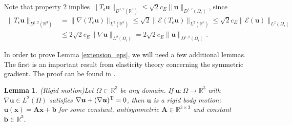 \documentclass[11pt]{article}
\numberwithin{equation}{section}
\newcommand{\R}{\mathbb{R}}
\newcommand{\E}{\mathcal{E}}
\newcommand{\bu}{\bm{u}}
\newcommand{\bx}{\bm{x}}
\newtheorem{lemma}[theorem]{Lemma}
\theoremstyle{definition}
\begin{document}
Note that property 2 implies $\|T_{\epsilon}\bu\|_{D^{1,2}(\R^3)} \le \sqrt{2} c_E \|\bu\|_{D^{1,2}(\Omega_{\epsilon})}$, since
\begin{align*}
\|T_{\epsilon}\bu\|_{D^{1,2}(\R^3)} &= \|\nabla(T_{\epsilon}\bu)\|_{L^2(\R^3)} \le \sqrt{2} \|\E(T_{\epsilon}\bu) \|_{L^2(\R^3)} \le \sqrt{2} c_E \| \E(\bu)\|_{L^2(\Omega_{\epsilon})} \\
& \le 2\sqrt{2} c_E \|\nabla \bu \|_{L^2(\Omega_{\epsilon})} = 2\sqrt{2} c_E \| \bu \|_{D^{1,2}(\Omega_{\epsilon})} .
\end{align*}

In order to prove Lemma \ref{extension_eps}, we will need a few additional lemmas. The first is an important result from elasticity theory concerning the symmetric gradient. The proof can be found in \cite{duvaut1976inequalities}.  
\begin{lemma}\emph{(Rigid motion)}\label{rigid_motion}
Let $\Omega \subset \R^3$ be any domain. If $\bu: \Omega \to \R^3$ with $\nabla \bu \in L^2(\Omega)$ satisfies $\nabla \bu +(\nabla \bu)^{\rm T}=0$, then $\bu$ is a rigid body motion: $\bu(\bx) = \bm{A}\bx+{\bm b}$ for some constant, antisymmetric $\bm{A}\in \R^{3\times3}$ and constant ${\bm b}\in \R^3$. 
\end{lemma}
\end{document}
